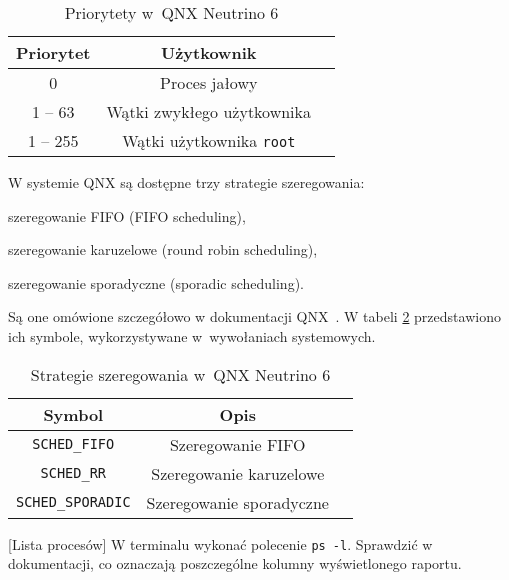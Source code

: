 \begin{table}[h!]
  \centering
  \caption{Priorytety w~QNX Neutrino 6}
  \label{tab:2N6W7}
  \begin{tabular}{|c|c|c|}
    \hline
    \textbf{Priorytet} & \textbf{Użytkownik} \\ \hline
    0 & Proces jałowy \\ \hline
    1 -- 63 & Wątki zwykłego użytkownika \\ \hline
    1 -- 255 & Wątki użytkownika \texttt{root} \\ \hline
  \end{tabular}
\end{table}

W systemie QNX są dostępne trzy strategie szeregowania:
\begin{myitemize}
  \item szeregowanie FIFO (FIFO scheduling),
  \item szeregowanie karuzelowe (round robin scheduling),
  \item szeregowanie sporadyczne (sporadic scheduling).
\end{myitemize}
Są one omówione szczegółowo w dokumentacji QNX~\cite{qnx}. W tabeli
\ref{tab:A9C2X} przedstawiono ich symbole, wykorzystywane w~wywołaniach
systemowych.


\begin{table}[h!]
  \centering
  \caption{Strategie szeregowania w~QNX Neutrino 6}
  \label{tab:A9C2X}
  \begin{tabular}{|c|c|c|}
    \hline
    \textbf{Symbol}           & \textbf{Opis} \\ \hline
    \texttt{SCHED\_FIFO}      & Szeregowanie FIFO \\ \hline
    \texttt{SCHED\_RR}        & Szeregowanie karuzelowe \\ \hline
    \texttt{SCHED\_SPORADIC}  & Szeregowanie sporadyczne \\ \hline
  \end{tabular}
\end{table}

\begin{example}{[Lista procesów]}
  \label{ex:TYRDA}
  W terminalu wykonać polecenie \texttt{ps -l}. Sprawdzić w {\color{red}dokumentacji},
  co oznaczają poszczególne kolumny wyświetlonego raportu.
\end{example}


